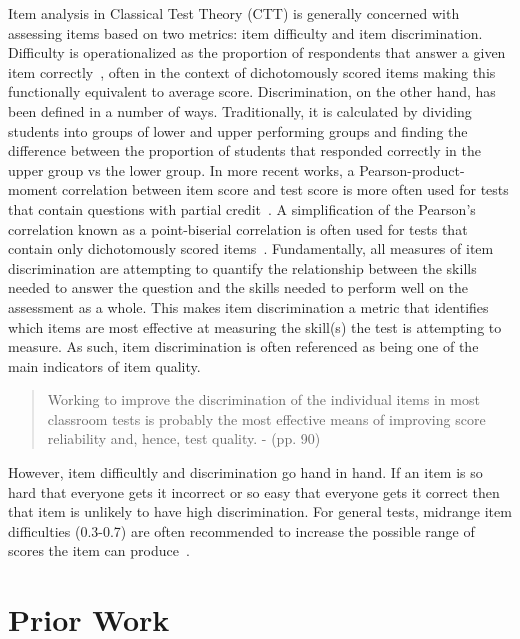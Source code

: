 \documentclass[authorversion,nonacm]{acmart}
\begin{document}
Item analysis in Classical Test Theory (CTT) is generally concerned with
assessing items based on two metrics: item difficulty and item discrimination.
Difficulty is operationalized as the proportion of respondents that answer a
given item correctly~\cite{engelhart1965comparison, brennan1972generalized},
often in the context of dichotomously scored items making this functionally
equivalent to average score.  Discrimination, on the other hand, has been
defined in a number of ways.  Traditionally, it is calculated by dividing
students into groups of lower and upper performing groups and finding the difference
between
the proportion of students that responded correctly in the upper group vs the
lower group. In more recent works, a Pearson-product-moment correlation between
item score and test score is more often used for tests that contain questions
with partial credit~\cite{setiawan2014simulation}. A simplification of the
Pearson's correlation known as a point-biserial correlation is often used for
tests that contain only dichotomously scored items~\cite{kornbrot2014point}.
Fundamentally, all measures of item discrimination are attempting to quantify
the relationship between the skills needed to answer the question and the skills
needed to perform well on the assessment as a whole. This makes item discrimination a
metric that identifies which items are most effective at measuring the skill(s)
the test is attempting to measure.  As such, item discrimination is often
referenced as being one of the main indicators of item quality. 
\begin{quote}
    Working to improve the discrimination of the individual items in most
    classroom tests is probably the most effective means of improving score
    reliability and, hence, test quality. - \citet{ebel1972essentials} (pp. 90)
\end{quote}
However, item difficultly and discrimination go hand in hand. If an item is
so hard that everyone gets it incorrect or so easy that everyone gets it correct then that item is unlikely to have high discrimination. For general tests, midrange item difficulties (0.3-0.7)
are often recommended to increase the possible range of scores the item can
produce~\cite{lord1953application, ebel1972essentials, hotiu2006relationship}.

\section{Prior Work}
\end{document}
